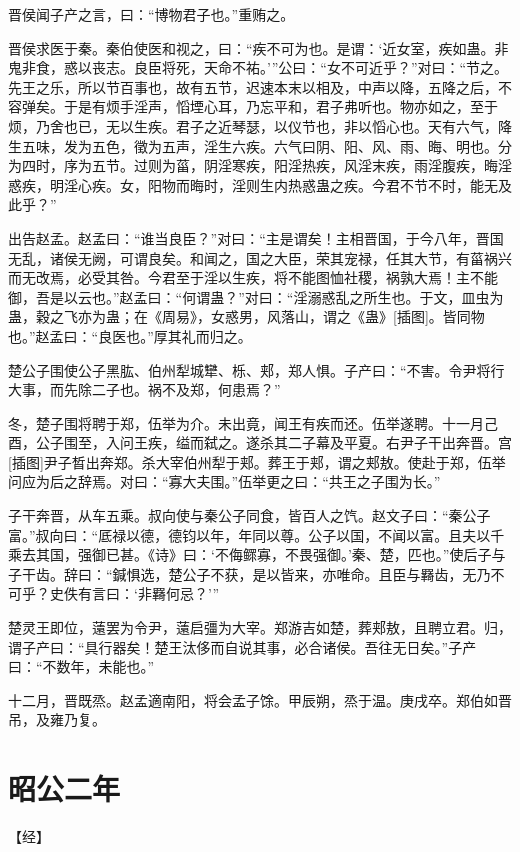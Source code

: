 \documentclass[a4paper,12pt,UTF8,twoside]{ctexbook}
\begin{document}
晋侯闻子产之言，曰：“博物君子也。”重贿之。

晋侯求医于秦。秦伯使医和视之，曰：“疾不可为也。是谓：‘近女室，疾如蛊。非鬼非食，惑以丧志。良臣将死，天命不祐。’”公曰：“女不可近乎？”对曰：“节之。先王之乐，所以节百事也，故有五节，迟速本末以相及，中声以降，五降之后，不容弹矣。于是有烦手淫声，慆堙心耳，乃忘平和，君子弗听也。物亦如之，至于烦，乃舍也已，无以生疾。君子之近琴瑟，以仪节也，非以慆心也。天有六气，降生五味，发为五色，徵为五声，淫生六疾。六气曰阴、阳、风、雨、晦、明也。分为四时，序为五节。过则为菑，阴淫寒疾，阳淫热疾，风淫末疾，雨淫腹疾，晦淫惑疾，明淫心疾。女，阳物而晦时，淫则生内热惑蛊之疾。今君不节不时，能无及此乎？”

出告赵孟。赵孟曰：“谁当良臣？”对曰：“主是谓矣！主相晋国，于今八年，晋国无乱，诸侯无阙，可谓良矣。和闻之，国之大臣，荣其宠禄，任其大节，有菑祸兴而无改焉，必受其咎。今君至于淫以生疾，将不能图恤社稷，祸孰大焉！主不能御，吾是以云也。”赵孟曰：“何谓蛊？”对曰：“淫溺惑乱之所生也。于文，皿虫为蛊，穀之飞亦为蛊；在《周易》，女惑男，风落山，谓之《蛊》[插图]。皆同物也。”赵孟曰：“良医也。”厚其礼而归之。

楚公子围使公子黑肱、伯州犁城犫、栎、郏，郑人惧。子产曰：“不害。令尹将行大事，而先除二子也。祸不及郑，何患焉？”

冬，楚子围将聘于郑，伍举为介。未出竟，闻王有疾而还。伍举遂聘。十一月己酉，公子围至，入问王疾，缢而弑之。遂杀其二子幕及平夏。右尹子干出奔晋。宫[插图]尹子晳出奔郑。杀大宰伯州犁于郏。葬王于郏，谓之郏敖。使赴于郑，伍举问应为后之辞焉。对曰：“寡大夫围。”伍举更之曰：“共王之子围为长。”

子干奔晋，从车五乘。叔向使与秦公子同食，皆百人之饩。赵文子曰：“秦公子富。”叔向曰：“厎禄以德，德钧以年，年同以尊。公子以国，不闻以富。且夫以千乘去其国，强御已甚。《诗》曰：‘不侮鳏寡，不畏强御。’秦、楚，匹也。”使后子与子干齿。辞曰：“鍼惧选，楚公子不获，是以皆来，亦唯命。且臣与羇齿，无乃不可乎？史佚有言曰：‘非羇何忌？’”

楚灵王即位，薳罢为令尹，薳启彊为大宰。郑游吉如楚，葬郏敖，且聘立君。归，谓子产曰：“具行器矣！楚王汰侈而自说其事，必合诸侯。吾往无日矣。”子产曰：“不数年，未能也。”

十二月，晋既烝。赵孟適南阳，将会孟子馀。甲辰朔，烝于温。庚戌卒。郑伯如晋吊，及雍乃复。


\chapter{昭公二年}



【经】
\end{document}
